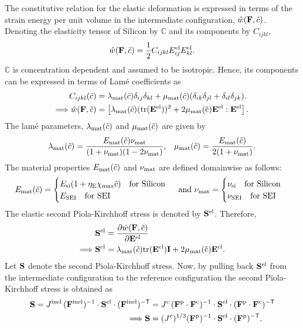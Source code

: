 The constitutive relation for the elastic deformation is expressed in terms of the strain energy per unit volume in the intermediate configuration, $\hat{w}(\mathbf{F}, \tilde{c})$. Denoting the elasticity tensor of Silicon by $\mathbb{C}$ and its components by $C_{ijkl}$,
\begin{gather}
    \hat{w}(\mathbf{F}, \tilde{c}) = \frac{1}{2} C_{ijkl} E_{ij}^{{\rm{el}}} E_{kl}^{{\rm{el}}}.
\end{gather}
$\mathbb{C}$ is concentration dependent and assumed to be isotropic. Hence, its components can be expressed in terms of Lam\'{e} coefficients as 
\begin{align}
    C_{ijkl}(\tilde{c}) &= \lambda_{\rm{mat}}(\tilde{c})\delta_{ij} \delta_{kl} +  \mu_{\rm{mat}}(\tilde{c})(\delta_{ik} \delta_{jl} + \delta_{il} \delta_{jk}). \\
    \Longrightarrow \hat{w}(\mathbf{F}, \tilde{c}) &= \left[\lambda_{\rm{mat}}(\tilde{c}) (\rm{tr}(\mathbf{E}^{\rm{el}}))^2 + 2 \mu_{\rm{mat}}(\tilde{c}) \mathbf{E}^{{\rm{el}}}:\mathbf{E}^{{\rm{el}}}\right].
\end{align}
The lam\'{e} parameters, $\lambda_{\rm{mat}}(\tilde{c})$ and $\mu_{\rm{mat}}(\tilde{c})$ are given by
\begin{align}
    \lambda_{\rm{mat}}(\tilde{c}) = \frac{E_{\rm{mat}}(\tilde{c}) \nu_{\rm{mat}}}{(1+\nu_{\rm{mat}})(1-2\nu_{\rm{mat}})},
    && \mu_{\rm{mat}}(\tilde{c}) = \frac{E_{\rm{mat}}(\tilde{c})}{2(1+\nu_{\rm{mat}})}. \nonumber
\end{align}
The material properties $E_{\rm{mat}}(\tilde{c})$ and $\nu_{\rm{mat}}$ are defined domainwise as follows:
\[E_{\rm{mat}}(\tilde{c}) = \begin{cases}
     E_{\text{si}}(1 + \eta_{\rm{E}} \chi_{\rm{max}} \tilde{c}) \text{\quad for Silicon} \\
     E_{\rm{SEI}} \text{\quad  for SEI }
\end{cases} \text{ and }
\nu_{\rm{mat}} = \begin{cases}
     \nu_{{\rm{si}}} \text{\quad for Silicon} \\
     \nu_{\rm{SEI}} \text{\quad for SEI }
\end{cases}\]
The elastic second Piola-Kirchhoff stress is denoted by $\mathbf{S}^{\rm{el}}$. Therefore, 
\begin{align}
    \mathbf{S}^{\rm{el}} &= \frac{\partial \hat{w}(\mathbf{F}, \tilde{c})}{\partial \mathbf{E}^{{\rm{el}}}}\nonumber \\
    \Longrightarrow  \mathbf{S}^{\rm{el}} &= \lambda_{\rm{mat}}(\tilde{c}) \rm{tr}(\mathbf{E}^{\rm{el}})\mathbf{I} + 2 \mu_{\rm{mat}}(\tilde{c}) \mathbf{E}^{\rm{el}}. \label{eq:Sel_tensor}
\end{align}
Let $\mathbf{S}$ denote the second Piola-Kirchhoff stress. Now, by pulling back $\mathbf{S}^{{\rm{el}}}$ from the intermediate configuration to the reference configuration \citep{2010Gurtin} the second Piola-Kirchhoff stress is obtained as
\begin{align}
    \mathbf{S} = J^{{\rm{inel}}} \, (\mathbf{F}^{\rm{inel}})^{-1} \cdot  \mathbf{S}^{\rm{el}} \cdot  (\mathbf{F}^{\rm{inel}})^{{-\sf {T}}} &= {J^c} \, (\mathbf{F}^{{\rm{p}}} \cdot \mathbf{F}^{{\rm{c}}})^{-1} \cdot \mathbf{S}^{{\rm{el}}} \cdot (\mathbf{F}^{\rm{p}} \cdot \mathbf{F}^{\rm{c}})^{{-\sf {T}}}\nonumber\\
    \Longrightarrow \mathbf{S} &= ({J^c})^{1/3} (\mathbf{F}^{\rm{p}})^{-1} \cdot \mathbf{S}^{{\rm{el}}} \cdot  (\mathbf{F}^{\rm{p}})^{{-\sf {T}}}.\label{eq:S_tensor}
\end{align}
